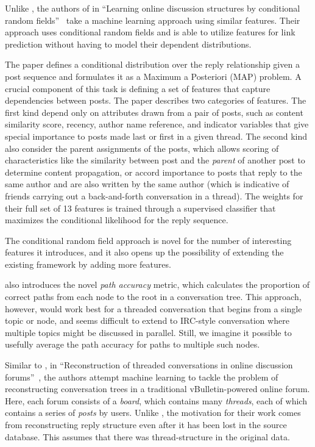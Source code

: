 \documentclass[10pt]{article}
\newcommand{\titlecite}[2]{``#1''~\cite{#2}}
\begin{document}
Unlike \cite{Wang2008a}, the authors of in \titlecite{Learning online
discussion structures by conditional random fields}{Wang2011a} take a machine
learning approach using similar features. Their approach uses conditional
random fields and is able to utilize features for link prediction without
having to model their dependent distributions.

The \cite{Wang2011a} paper defines a conditional distribution over the reply
relationship given a post sequence and formulates it as a Maximum a Posteriori
(MAP) problem. A crucial component of this task is defining a set of features
that capture dependencies between posts. The paper describes two categories of
features. The first kind depend only on attributes drawn from a pair
of posts, such as content similarity score, recency, author name reference, and
indicator variables that give special importance to posts made last or first in
a given thread. The second kind also consider the parent assignments of
the posts, which allows scoring of characteristics like the
similarity between  post and the \emph{parent} of another post to determine
content propagation, or accord importance to posts that reply to the same author
and are also written by the same author (which is indicative of friends carrying
out a back-and-forth conversation in a thread). The weights for their full set of
13 features is trained through a supervised classifier that maximizes the
conditional likelihood for the reply sequence.

The conditional random field approach is novel for the number
of interesting features it introduces, and it also opens up the possibility of
extending the existing framework by adding more features.

\cite{Wang2011a} also introduces the novel \emph{path accuracy} metric, which
calculates the proportion of correct paths from each node to the root in a
conversation tree. This approach, however, would work best for a threaded
conversation that begins from a single topic or node, and seems difficult to extend
to IRC-style conversation where multiple topics might
be discussed in parallel. Still, we imagine it possible to usefully average the path
accuracy for paths to multiple such nodes.

Similar to \cite{Wang2011a}, in \titlecite{Reconstruction of threaded
conversations in online discussion forums}{Aumayr2011a}, the authors attempt machine learning to 
tackle the problem of reconstructing conversation trees in a traditional
vBulletin-powered online forum. Here, each forum consists of a \textit{board}, which
contains many \textit{threads}, each of which contains a series of
\textit{posts} by users. Unlike \cite{Wang2008a}, the motivation for their work
comes from reconstructing reply structure even after it has been lost in the
source database. This assumes that there was thread-structure in the original
data.
\end{document}
